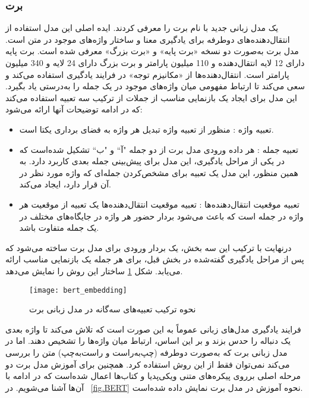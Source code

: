 \subsubsection{برت}
\label{section.bert}
\citet{devlin2018bert} 
یک مدل زبانی جدید با نام برت را معرفی کردند. ایده اصلی این مدل استفاده از انتقال‌دهنده‌های‌ دوطرفه برای یادگیری معنا و ساختار واژه‌های موجود در متن است. مدل برت به‌صورت دو نسخه «برت پایه» و «برت بزرگ» معرفی شده ‌است. برت پایه دارای 12 لایه انتقال‌دهنده و  110 میلیون پارامتر و برت بزرگ دارای  24 لایه و 340 میلیون پارامتر است. انتقال‌دهنده‌ها از «مکانیزم توجه» در فرایند یادگیری استفاده می‌کند و سعی می‌کند تا ارتباط مفهومی میان واژه‌های موجود در یک جمله را به‌درستی یاد بگیرد. این مدل برای ایجاد یک بازنمایی مناسب از جملات از ترکیب سه تعبیه استفاده می‌کند که در ادامه توضیحات آنها ارائه می‌شود:
\begin{itemize}
	\item{تعبیه واژه }: منظور از تعبیه واژه تبدیل هر واژه به فضای برداری یکتا است.
	
	\item{تعبیه جمله }: هر داده ورودی مدل برت از دو جمله "آ`` و "ب`` تشکیل شده‌است که در یکی از مراحل یادگیری، این مدل برای پیش‌بینی جمله بعدی کاربرد دارد. به همین منظور، این مدل یک تعبیه برای مشخص‌کردن جمله‌ای که واژه مورد نظر در آن قرار دارد، ایجاد می‌کند.
	\item{تعبیه موقعیت انتقال‌دهنده‌ها }: تعبیه موقعیت انتقال‌دهنده‌ها یک تعبیه از موقعیت هر واژه در جمله است که باعث می‌شود بردار حضور هر واژه در جایگاه‌های مختلف در یک جمله متفاوت باشد.
\end{itemize}

درنهایت با ترکیب این سه بخش، یک بردار ورودی برای مدل برت ساخته می‌شود که پس از مراحل یادگیری گفته‌شده در بخش قبل، برای هر جمله یک بازنمایی مناسب ارائه می‌یابد. شکل \ref{fig.bert_embedding} ساختار این روش را نمایش می‌دهد.

\begin{figure}[!h]
	\texttt{[image: bert\_embedding]}
	\centering
	\caption{نحوه ترکیب تعبیه‌های سه‌گانه در مدل زبانی برت \citep{devlin2018bert}}
	\label{fig.bert_embedding}
\end{figure}
 فرایند یادگیری مدل‌های زبانی عموماً به این صورت است که تلاش می‌کند تا واژه بعدی یک دنباله را حدس بزند و بر این اساس، ارتباط میان واژه‌ها را تشخیص دهند. اما در مدل زبانی برت که به‌صورت دوطرفه (چپ‌به‌راست و راست‌به‌چپ) متن را بررسی می‌کند نمی‌توان فقط از این روش استفاده کرد. 
همچنین برای آموزش مدل برت دو مرحله اصلی برروی پیکره‌های متنی ویکی‌پدیا و کتاب‌ها اعمال شده‌است که در ادامه با آن‌ها آشنا می‌شویم. 
 در \figurename~\ref{fig.BERT} نحوه آموزش در مدل برت نمایش داده شده‌است.

